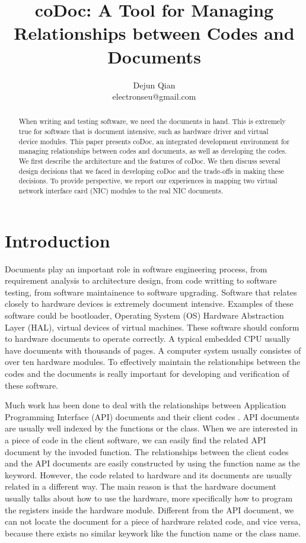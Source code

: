 \documentclass[11pt,letterpaper,oneside]{article}
\title{coDoc: A Tool for Managing Relationships between Codes and Documents}
\author{Dejun Qian\\electronseu@gmail.com}
\date{}
\begin{document}
\maketitle

\begin{abstract}
When writing and testing software, 
we need the documents in hand.
This is extremely true for software that is document intensive, 
such as hardware driver and virtual device modules.
This paper presents coDoc, 
an integrated development environment for managing relationships between codes and documents, as well as developing the codes. 
We first describe the architecture and the features of coDoc.
We then discuss several design decisions that we faced in developing coDoc and the trade-offs in making these decisions.
To provide perspective,
we report our experiences in mapping two virtual network interface card (NIC) modules to the real NIC documents.
\end{abstract}

\section{Introduction}
\label{sec:introduction}
Documents play an important role in software engineering process,
from requirement analysis to architecture design,
from code writting to software testing,
from software maintainence to software upgrading.
Software that relates closely to hardware devices is extremely document intensive.
Examples of these software could be bootloader, 
Operating System (OS) Hardware Abstraction Layer (HAL),
virtual devices of virtual machines.
These software should conform to hardware documents to operate correctly.
A typical embedded CPU usually have documents with thousands of pages.
A computer system usually consistes of over ten hardware modules.
To effectively maintain the relationships between the codes and the documents is really important for developing and verification of these software.

Much work has been done to deal with the relationships between Application Programming Interface (API) documents and their client codes \cite{Pandita_inferring_2012}.
API documents are usually well indexed by the functions or the class.
When we are interested in a piece of code in the client software,
we can easily find the related API document by the invoded function.
The relationships between the client codes and the API documents are easily constructed by using the function name as the keyword.
However, the code related to hardware and its documents are usually related in a different way.
The main reason is that the hardware document usually talks about how to use the hardware,
more specifically how to program the registers inside the hardware module.
Different from the API document,
we can not locate the document for a piece of hardware related code, and vice versa,
because there exists no similar keywork like the function name or the class name.
\end{document}
